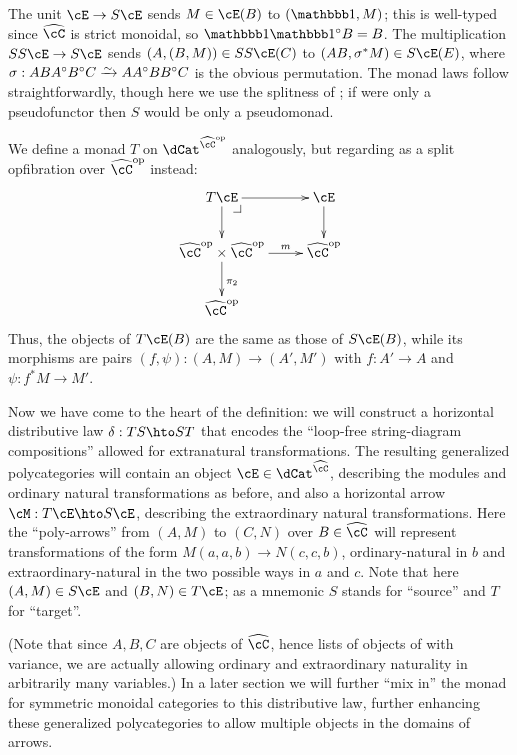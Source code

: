 \documentclass{amsart}
\newcommand{\C}{\cC}
\renewcommand{\Chat}{\ensuremath{\widehat{\C}}\xspace}
\newcommand{\E}{\cE}
\newcommand{\one}{\done}
\renewcommand{\o}{^{\circ}}
\begin{document}
The unit $\E\to S\E$ sends $M\in \E(B)$ to $(\one,M)$; this is well-typed since $\Chat$ is strict monoidal, so $\one\one\o B = B$.
The multiplication $SS\E\to S\E$ sends $(A,(B,M)) \in S S \E(C)$ to $(AB,\sigma^* M)\in S\E(E)$, where $\sigma : ABA\o B\o C \toiso A A\o B B\o C$ is the obvious permutation.
The monad laws follow straightforwardly, though here we use the splitness of \E; if \E were only a pseudofunctor then $S$ would be only a pseudomonad.

We define a monad $T$ on $\dCat^{\Chat\op}$ analogously, but regarding \E as a split opfibration over $\Chat\op$ instead:
\[ \xymatrix{ T \E \ar[r] \ar[d] \pullback & \E \ar[d] \\
  \Chat\op\times\Chat\op \ar[r]^-m \ar[d]^{\pi_2} & \Chat\op \\
  \Chat\op }\]
Thus, the objects of $T\E(B)$ are the same as those of $S\E(B)$, while its morphisms are pairs $(f,\psi) : (A,M)\to (A',M')$ with $f:A'\to A$ and $\psi : f^* M \to M'$.

Now we have come to the heart of the definition: we will construct a horizontal distributive law $\delta : TS \hto ST$ that encodes the ``loop-free string-diagram compositions'' allowed for extranatural transformations.
The resulting generalized polycategories will contain an object $\E\in \dCat^{\Chat}$, describing the modules and ordinary natural transformations as before, and also a horizontal arrow $\cM: T\E \hto S\E$, describing the extraordinary natural transformations.
Here the ``poly-arrows'' from $(A,M)$ to $(C,N)$ over $B\in\Chat$ will represent transformations of the form $M(a,a,b) \to N(c,c,b)$, ordinary-natural in $b$ and extraordinary-natural in the two possible ways in $a$ and $c$.
Note that here $(A,M)\in S\E$ and $(B,N)\in T\E$; as a mnemonic $S$ stands for ``source'' and $T$ for ``target''.

(Note that since $A,B,C$ are objects of $\Chat$, hence lists of objects of \C with variance, we are actually allowing ordinary and extraordinary naturality in arbitrarily many variables.)
In a later section we will further ``mix in'' the monad for symmetric monoidal categories to this distributive law, further enhancing these generalized polycategories to allow multiple objects in the domains of arrows.
\end{document}
